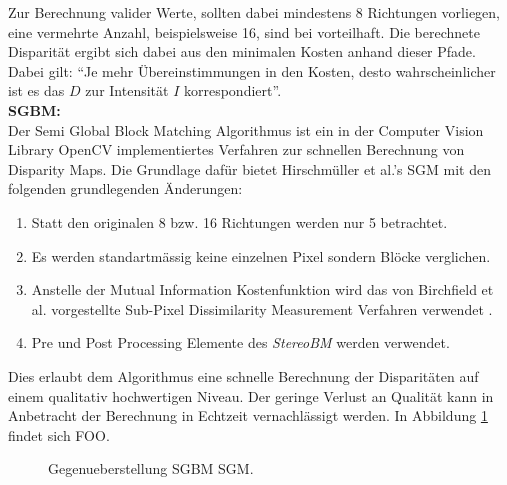 \noindent
Zur Berechnung valider Werte, sollten dabei mindestens 8 Richtungen vorliegen, eine vermehrte Anzahl, beispielsweise 16, sind bei vorteilhaft. Die berechnete Disparität ergibt sich dabei aus den minimalen Kosten anhand dieser Pfade. Dabei gilt: “Je mehr Übereinstimmungen in den Kosten, desto wahrscheinlicher ist es das $D$ zur Intensität $I$ korrespondiert”.\\

\noindent
\textbf{SGBM:} \\
Der Semi Global Block Matching Algorithmus ist ein in der Computer Vision Library OpenCV implementiertes Verfahren zur schnellen Berechnung von Disparity Maps. Die Grundlage dafür bietet Hirschmüller et al.’s SGM \cite{hirschmueller2008sgm} mit den folgenden grundlegenden Änderungen:

\begin{enumerate}[label=C.\arabic*]
	\item Statt den originalen 8 bzw. 16 Richtungen werden nur 5 betrachtet. \label{item:differences_directions}
	\item Es werden  standartm\"assig keine einzelnen Pixel sondern Blöcke verglichen. \label{item:differences_matching}
	\item Anstelle der Mutual Information Kostenfunktion wird das von Birchfield et al. vorgestellte Sub-Pixel Dissimilarity Measurement Verfahren verwendet \cite{birchfield-tomasi}.
	\item Pre und Post Processing Elemente des \emph{StereoBM} \cite{opencv_doc} werden verwendet.
\end{enumerate}

\noindent
Dies erlaubt dem Algorithmus eine schnelle Berechnung der Disparitäten auf einem qualitativ hochwertigen Niveau. Der geringe Verlust an Qualität kann in Anbetracht der Berechnung in Echtzeit vernachlässigt werden. In Abbildung \ref{fig:sgbm_vs_sgm} findet sich FOO.
\begin{figure}
	\begin{center}
	\end{center}
	\caption{Gegenueberstellung SGBM SGM.}
	\label{fig:sgbm_vs_sgm}
\end{figure}



